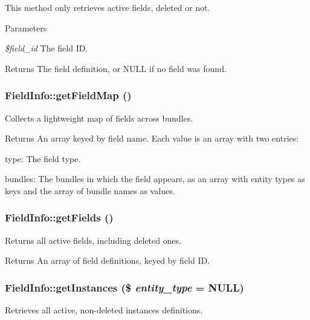 This method only retrieves active fields, deleted or not.


\begin{DoxyParams}{Parameters}
\item[{\em \$field\_\-id}]The field ID.\end{DoxyParams}
\begin{DoxyReturn}{Returns}
The field definition, or NULL if no field was found. 
\end{DoxyReturn}
\hypertarget{classFieldInfo_a626d055e692aad18ce67e2bc0dfa3b41}{
\subsubsection[{getFieldMap}]{\setlength{\rightskip}{0pt plus 5cm}FieldInfo::getFieldMap ()}}
\label{classFieldInfo_a626d055e692aad18ce67e2bc0dfa3b41}
Collects a lightweight map of fields across bundles.

\begin{DoxyReturn}{Returns}
An array keyed by field name. Each value is an array with two entries:
\begin{DoxyItemize}
\item type: The field type.
\item bundles: The bundles in which the field appears, as an array with entity types as keys and the array of bundle names as values. 
\end{DoxyItemize}
\end{DoxyReturn}
\hypertarget{classFieldInfo_a5e817caa8f9c7fae505f9764ee676e0b}{
\subsubsection[{getFields}]{\setlength{\rightskip}{0pt plus 5cm}FieldInfo::getFields ()}}
\label{classFieldInfo_a5e817caa8f9c7fae505f9764ee676e0b}
Returns all active fields, including deleted ones.

\begin{DoxyReturn}{Returns}
An array of field definitions, keyed by field ID. 
\end{DoxyReturn}
\hypertarget{classFieldInfo_af3f374479203c6cafc6ec01655e0df76}{
\subsubsection[{getInstances}]{\setlength{\rightskip}{0pt plus 5cm}FieldInfo::getInstances (\$ {\em entity\_\-type} = {\ttfamily NULL})}}
\label{classFieldInfo_af3f374479203c6cafc6ec01655e0df76}
Retrieves all active, non-\/deleted instances definitions.


